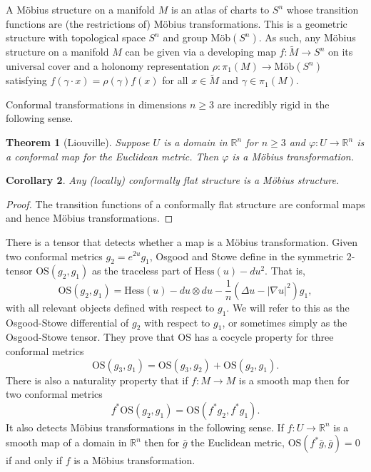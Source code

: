 \documentclass{amsart}
\newcommand{\R}{\mathbb{R}}
\newtheorem{thm}{Theorem}[section]
\newtheorem{cor}[thm]{Corollary}
\begin{document}
A M\"obius structure on a manifold $M$ is an atlas of charts to $S^n$ whose transition functions are (the restrictions of) M\"obius transformations.
This is a geometric structure with topological space $S^n$ and group $\text{M\"ob}(S^n)$. 
As such, any M\"obius structure on a manifold $M$ can be given via a developing map $f: \tilde{M} \to S^n$ on its universal cover and a holonomy representation $\rho: \pi_1(M) \to \text{M\"ob}(S^n)$ satisfying $f(\gamma \cdot x) = \rho(\gamma)f(x)$ for all $x \in \tilde{M}$ and $\gamma \in \pi_1(M)$.

Conformal transformations in dimensions $n \geq 3$ are incredibly rigid in the following sense. 

\begin{thm}[Liouville]
Suppose $U$ is a domain in $\R^n$ for $n \geq 3$ and $\varphi: U \to \R^n$ is a conformal map for the Euclidean metric. Then $\varphi$ is a M\"obius transformation.
\end{thm}

\begin{cor}
Any (locally) conformally flat structure is a M\"obius structure. 
\end{cor}
\begin{proof}
The transition functions of a conformally flat structure are conformal maps and hence M\"obius transformations.
\end{proof}

There is a tensor that detects whether a map is a M\"obius transformation. 
Given two conformal metrics $g_2 = e^{2u}g_1$, Osgood and Stowe define in \cite{Osgood-Stowe1992} the symmetric 2-tensor $\mathrm{OS}(g_2,g_1)$ as the traceless part of $\mathrm{Hess}(u) - du^2$.
That is, 
\[
\mathrm{OS}(g_2,g_1) = \mathrm{Hess}(u)  - du\otimes du - \frac{1}{n}\left( \Delta u - |\nabla u|^2\right)g_1,
\]
with all relevant objects defined with respect to $g_1$.
We will refer to this as the Osgood-Stowe differential of $g_2$ with respect to $g_1$, or sometimes simply as the Osgood-Stowe tensor.
They prove that $\mathrm{OS}$ has a cocycle property for three conformal metrics
\[
\mathrm{OS}(g_3,g_1) = \mathrm{OS}(g_3,g_2) + \mathrm{OS}(g_2,g_1).
\]
There is also a naturality property that if $f: M \to M$ is a smooth map then for two conformal metrics
\[
f^*\mathrm{OS}(g_2,g_1) = \mathrm{OS}(f^*g_2,f^*g_1).
\]
It also detects M\"obius transformations in the following sense. 
If $f:U \to \R^n$ is a smooth map of a domain in $\R^n$ then for $\bar{g}$ the Euclidean metric, $\mathrm{OS}(f^*\bar{g},\bar{g}) = 0$ if and only if $f$ is a M\"obius transformation.
\end{document}

